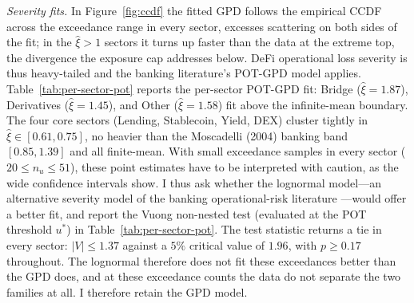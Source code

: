 \documentclass[runningheads]{llncs}
\begin{document}
\emph{Severity fits.} In Figure~\ref{fig:ccdf} the fitted GPD follows the
empirical CCDF across the exceedance range in every sector, excesses
scattering on both sides of the fit; in the $\hat\xi>1$ sectors it turns up
faster than the data at the extreme top, the divergence the exposure cap
addresses below. DeFi operational loss severity is thus heavy-tailed and the
banking literature's POT-GPD model applies. Table~\ref{tab:per-sector-pot} reports the per-sector
POT-GPD fit: Bridge ($\hat\xi=1.87$), Derivatives
($\hat\xi=1.45$), and Other ($\hat\xi=1.58$) fit above the infinite-mean
boundary. The four core sectors (Lending,
Stablecoin, Yield, DEX) cluster tightly in $\hat\xi \in [0.61, 0.75]$,
no heavier than the Moscadelli (2004) banking band $[0.85, 1.39]$ and
all finite-mean. With small exceedance samples in every sector ($20 \leq n_u \leq 51$),
these point estimates have to be interpreted with caution, as the wide
confidence intervals show. I thus ask whether the lognormal model---an alternative severity model of
the banking operational-risk literature
\citep{Fontnouvelle2006,Chernobai2008}---would offer a better fit, and report the Vuong \citep{Vuong1989} non-nested test (evaluated at the POT threshold $u^*$) in Table~\ref{tab:per-sector-pot}.
The test statistic returns a tie in every sector: $|V| \le 1.37$ against a $5\%$ critical value of $1.96$, with $p \ge 0.17$ throughout. The lognormal therefore does not fit these exceedances better than the GPD does, and at these exceedance counts the data do not separate the two families at all. I therefore retain the GPD model.
\end{document}
